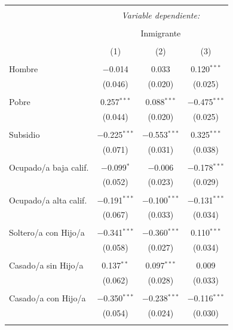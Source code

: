 \documentclass[12pt,a4paper]{article}
\begin{document}
\begin{table}[!htbp] \centering 
  \caption{} 
  \label{cuadro:reg_expulsion} 
\scriptsize 
\begin{tabular}{@{\extracolsep{5pt}}lccc} 
\\[-1.8ex]\hline 
\hline \\[-1.8ex] 
 & \multicolumn{3}{c}{\textit{Variable dependiente:}} \\ 
\cline{2-4} 
\\[-1.8ex] & \multicolumn{3}{c}{Inmigrante} \\ 
\\[-1.8ex] & (1) & (2) & (3)\\ 
\hline \\[-1.8ex] 
 Hombre & $-$0.014 & 0.033 & 0.120$^{***}$ \\ 
  & (0.046) & (0.020) & (0.025) \\ 
  & & & \\ 
 Pobre & 0.257$^{***}$ & 0.088$^{***}$ & $-$0.475$^{***}$ \\ 
  & (0.044) & (0.020) & (0.025) \\ 
  & & & \\ 
 Subsidio & $-$0.225$^{***}$ & $-$0.553$^{***}$ & 0.325$^{***}$ \\ 
  & (0.071) & (0.031) & (0.038) \\ 
  & & & \\ 
 Ocupado/a baja calif. & $-$0.099$^{*}$ & $-$0.006 & $-$0.178$^{***}$ \\ 
  & (0.052) & (0.023) & (0.029) \\ 
  & & & \\ 
 Ocupado/a alta calif. & $-$0.191$^{***}$ & $-$0.100$^{***}$ & $-$0.131$^{***}$ \\ 
  & (0.067) & (0.033) & (0.034) \\ 
  & & & \\ 
 Soltero/a con Hijo/a & $-$0.341$^{***}$ & $-$0.360$^{***}$ & 0.110$^{***}$ \\ 
  & (0.058) & (0.027) & (0.034) \\ 
  & & & \\ 
 Casado/a sin Hijo/a & 0.137$^{**}$ & 0.097$^{***}$ & 0.009 \\ 
  & (0.062) & (0.028) & (0.033) \\ 
  & & & \\ 
 Casado/a con Hijo/a & $-$0.350$^{***}$ & $-$0.238$^{***}$ & $-$0.116$^{***}$ \\ 
  & (0.054) & (0.024) & (0.030) \\ 
  & & & \\ 

\end{tabular}
\end{table}
\end{document}
